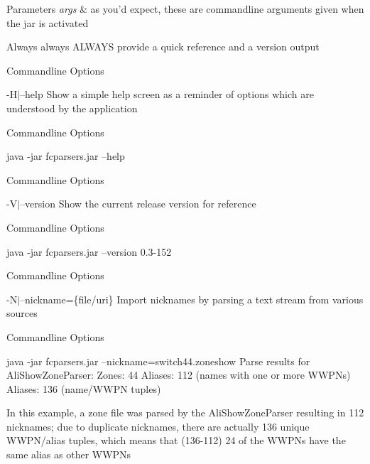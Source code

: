 \begin{DoxyParams}{Parameters}
{\em args} & as you'd expect, these are commandline arguments given when the jar is activated \\
\hline
\end{DoxyParams}
\begin{DoxyVerb}Always always ALWAYS provide a quick reference and a version output
\end{DoxyVerb}


\begin{DoxyRefDesc}{Commandline Options}
\item[{\bf Commandline Options}]-\/\+H$\vert$--help Show a simple help screen as a reminder of options which are understood by the application \end{DoxyRefDesc}
\begin{DoxyRefDesc}{Commandline Options}
\item[{\bf Commandline Options}]
\begin{DoxyCode}
java -jar fcparsers.jar --help 
\end{DoxyCode}
\end{DoxyRefDesc}


\begin{DoxyRefDesc}{Commandline Options}
\item[{\bf Commandline Options}]-\/\+V$\vert$--version Show the current release version for reference \end{DoxyRefDesc}
\begin{DoxyRefDesc}{Commandline Options}
\item[{\bf Commandline Options}]
\begin{DoxyCode}
java -jar fcparsers.jar --version
0.3-152 
\end{DoxyCode}
\end{DoxyRefDesc}


\begin{DoxyRefDesc}{Commandline Options}
\item[{\bf Commandline Options}]-\/\+N$\vert$--nickname=\{file/uri\} Import nicknames by parsing a text stream from various sources \end{DoxyRefDesc}
\begin{DoxyRefDesc}{Commandline Options}
\item[{\bf Commandline Options}]
\begin{DoxyCode}
 java -jar fcparsers.jar --nickname=switch44.zoneshow
Parse results \textcolor{keywordflow}{for} AliShowZoneParser:
Zones: 44
Aliases: 112 (names with one or more WWPNs)
Aliases: 136 (name/WWPN tuples) 
\end{DoxyCode}
 In this example, a zone file was parsed by the Ali\+Show\+Zone\+Parser resulting in 112 nicknames; due to duplicate nicknames, there are actually 136 unique W\+W\+P\+N/alias tuples, which means that (136-\/112) 24 of the W\+W\+P\+Ns have the same alias as other W\+W\+P\+Ns\end{DoxyRefDesc}


